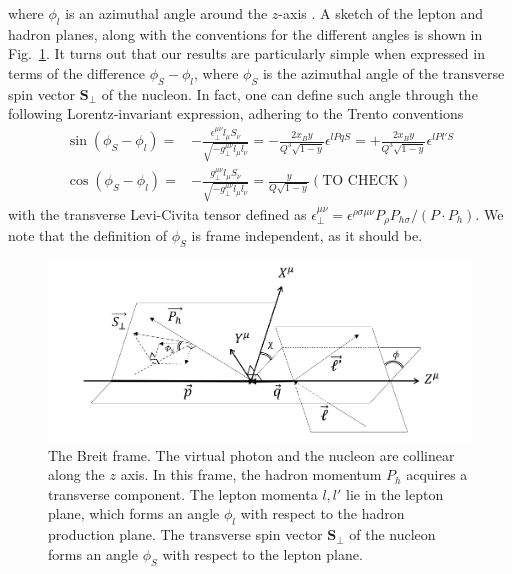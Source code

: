 where $\phi_l$ is an azimuthal angle around the $z$-axis \cite{kanazawa_contribution_2013}. A sketch of the lepton and hadron planes, along with the conventions for the different angles is shown in Fig.~\ref{fig:Breit frame}. It turns out that our results are particularly simple when expressed in terms of the difference $\phi_S-\phi_l$, where $\phi_S$ is the azimuthal angle of the transverse spin vector $\boldsymbol{S}_\perp$ of the nucleon. In fact, one can define such angle through the following Lorentz-invariant expression, adhering to the Trento conventions \cite{bacchetta_single-spin_2004}
\begin{equation}
\begin{aligned}
     \sin(\phi_S-\phi_l)=& -\frac{\epsilon_\perp^{\mu\nu}l_\mu S_\nu}{\sqrt{-g^{\mu\nu}_\perp l_\mu l_\nu}}=-\frac{2x_By}{Q^3\sqrt{1-y}}\epsilon^{lPqS}=+\frac{2x_By}{Q^3\sqrt{1-y}}\epsilon^{lPl'S}\\
      \cos(\phi_S-\phi_l)=& -\frac{g_\perp^{\mu\nu}l_\mu S_\nu}{\sqrt{-g^{\mu\nu}_\perp l_\mu l_\nu}}=\frac{y}{Q\sqrt{1-y}}(\text{TO CHECK})
\end{aligned}
\end{equation}
with the transverse Levi-Civita tensor defined as $\epsilon_\perp^{\mu\nu}=\epsilon^{\rho\sigma\mu\nu}P_\rho P_{h\sigma}/(P\cdot P_h)$. We note that the definition of $\phi_S$ is frame independent, as it should be.
\begin{figure}
    \centering
    \includegraphics[width=0.7\linewidth]{fig/frame.png}
    \caption{The Breit frame. The virtual photon and the nucleon are collinear along the $z$ axis. In this frame, the hadron momentum $P_h$ acquires a transverse component. The lepton momenta $l,l'$ lie in the lepton plane, which forms an angle $\phi_l$ with respect to the hadron production plane. The transverse spin vector $\boldsymbol{S}_\perp$ of the nucleon forms an angle $\phi_S$ with respect to the lepton plane.}
    \label{fig:Breit frame}
\end{figure}


